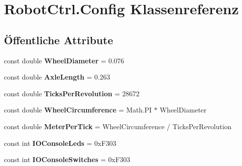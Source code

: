 \hypertarget{class_robot_ctrl_1_1_config}{
\section{RobotCtrl.Config Klassenreferenz}
\label{class_robot_ctrl_1_1_config}
}
\subsection*{Öffentliche Attribute}
\begin{DoxyCompactItemize}
\item 
\hypertarget{class_robot_ctrl_1_1_config_aa0a24400febddc495f58ccba68c6b5ef}{
const double {\bfseries WheelDiameter} = 0.076}
\label{class_robot_ctrl_1_1_config_aa0a24400febddc495f58ccba68c6b5ef}

\item 
\hypertarget{class_robot_ctrl_1_1_config_ad6c428a3696bf90c39cb30dd26c2cb58}{
const double {\bfseries AxleLength} = 0.263}
\label{class_robot_ctrl_1_1_config_ad6c428a3696bf90c39cb30dd26c2cb58}

\item 
\hypertarget{class_robot_ctrl_1_1_config_ab09729a18f3d44209d9963c414c86d5f}{
const double {\bfseries TicksPerRevolution} = 28672}
\label{class_robot_ctrl_1_1_config_ab09729a18f3d44209d9963c414c86d5f}

\item 
\hypertarget{class_robot_ctrl_1_1_config_ae8326de1ceb38f2ed7bafbb9d3dd4e1d}{
const double {\bfseries WheelCircumference} = Math.PI $\ast$ WheelDiameter}
\label{class_robot_ctrl_1_1_config_ae8326de1ceb38f2ed7bafbb9d3dd4e1d}

\item 
\hypertarget{class_robot_ctrl_1_1_config_af4084917ff005fc520bb1c337503c33d}{
const double {\bfseries MeterPerTick} = WheelCircumference / TicksPerRevolution}
\label{class_robot_ctrl_1_1_config_af4084917ff005fc520bb1c337503c33d}

\item 
\hypertarget{class_robot_ctrl_1_1_config_a989257f3f8a56aae7eaa00bf9de1d97f}{
const int {\bfseries IOConsoleLeds} = 0xF303}
\label{class_robot_ctrl_1_1_config_a989257f3f8a56aae7eaa00bf9de1d97f}

\item 
\hypertarget{class_robot_ctrl_1_1_config_a3d2acda1cb840afaf782a2c71eedc6b4}{
const int {\bfseries IOConsoleSwitches} = 0xF303}
\label{class_robot_ctrl_1_1_config_a3d2acda1cb840afaf782a2c71eedc6b4}


\end{DoxyCompactItemize}
